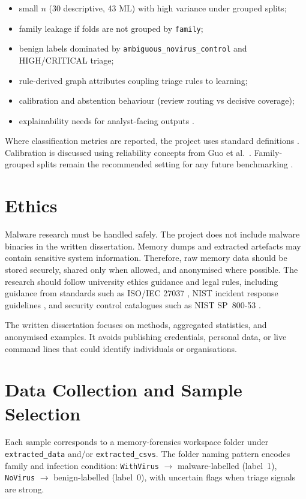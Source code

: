 \begin{itemize}
\item small $n$ (30 descriptive, 43 ML) with high variance under grouped splits;
\item family leakage if folds are not grouped by \texttt{family};
\item benign labels dominated by \texttt{ambiguous\_novirus\_control} and HIGH/CRITICAL triage;
\item rule-derived graph attributes coupling triage rules to learning;
\item calibration and abstention behaviour (review routing vs decisive coverage);
\item explainability needs for analyst-facing outputs \cite{doshi2017interpretable}.
\end{itemize}

Where classification metrics are reported, the project uses standard definitions \cite{davis2006roc}. Calibration is discussed using reliability concepts from Guo et al.\ \cite{guo2017calibration}. Family-grouped splits remain the recommended setting for any future benchmarking \cite{sommer2010outside}.

\section{Ethics}

Malware research must be handled safely. The project does not include malware binaries in the written dissertation. Memory dumps and extracted artefacts may contain sensitive system information. Therefore, raw memory data should be stored securely, shared only when allowed, and anonymised where possible. The research should follow university ethics guidance and legal rules, including guidance from standards such as ISO/IEC 27037 \cite{iso2012digital}, NIST incident response guidelines \cite{nist2012sp80061}, and security control catalogues such as NIST SP~800-53 \cite{nist2020sp80053}.

The written dissertation focuses on methods, aggregated statistics, and anonymised examples. It avoids publishing credentials, personal data, or live command lines that could identify individuals or organisations.

\section{Data Collection and Sample Selection}

Each sample corresponds to a memory-forensics workspace folder under \texttt{extracted\_data} and/or \texttt{extracted\_csvs}. The folder naming pattern encodes family and infection condition: \texttt{WithVirus} $\rightarrow$ malware-labelled (label~1), \texttt{NoVirus} $\rightarrow$ benign-labelled (label~0), with uncertain flags when triage signals are strong.

